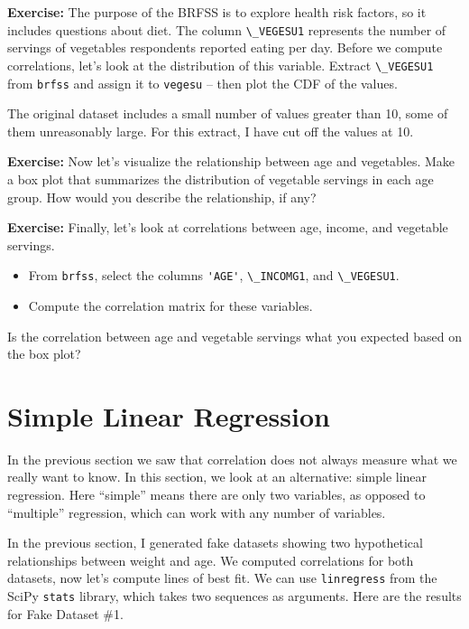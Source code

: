 \documentclass[
]{book}
\newcommand{\passthrough}[1]{#1}
\providecommand{\tightlist}{%
  \setlength{\itemsep}{0pt}\setlength{\parskip}{0pt}}
\begin{document}
\textbf{Exercise:} The purpose of the BRFSS is to explore health risk
factors, so it includes questions about diet. The column
\passthrough{\lstinline!\_VEGESU1!} represents the number of servings of
vegetables respondents reported eating per day. Before we compute
correlations, let's look at the distribution of this variable. Extract
\passthrough{\lstinline!\_VEGESU1!} from \passthrough{\lstinline!brfss!}
and assign it to \passthrough{\lstinline!vegesu!} -- then plot the CDF
of the values.

The original dataset includes a small number of values greater than 10,
some of them unreasonably large. For this extract, I have cut off the
values at 10.

\textbf{Exercise:} Now let's visualize the relationship between age and
vegetables. Make a box plot that summarizes the distribution of
vegetable servings in each age group. How would you describe the
relationship, if any?

\textbf{Exercise:} Finally, let's look at correlations between age,
income, and vegetable servings.

\begin{itemize}
\tightlist
\item
  From \passthrough{\lstinline!brfss!}, select the columns
  \passthrough{\lstinline!'AGE'!}, \passthrough{\lstinline!\_INCOMG1!},
  and \passthrough{\lstinline!\_VEGESU1!}.
\item
  Compute the correlation matrix for these variables.
\end{itemize}

Is the correlation between age and vegetable servings what you expected
based on the box plot?

\section{Simple Linear Regression}\label{simple-linear-regression}

In the previous section we saw that correlation does not always measure
what we really want to know. In this section, we look at an alternative:
simple linear regression. Here ``simple'' means there are only two
variables, as opposed to ``multiple'' regression, which can work with
any number of variables.

In the previous section, I generated fake datasets showing two
hypothetical relationships between weight and age. We computed
correlations for both datasets, now let's compute lines of best fit. We
can use \passthrough{\lstinline!linregress!} from the SciPy
\passthrough{\lstinline!stats!} library, which takes two sequences as
arguments. Here are the results for Fake Dataset \#1.
\end{document}
